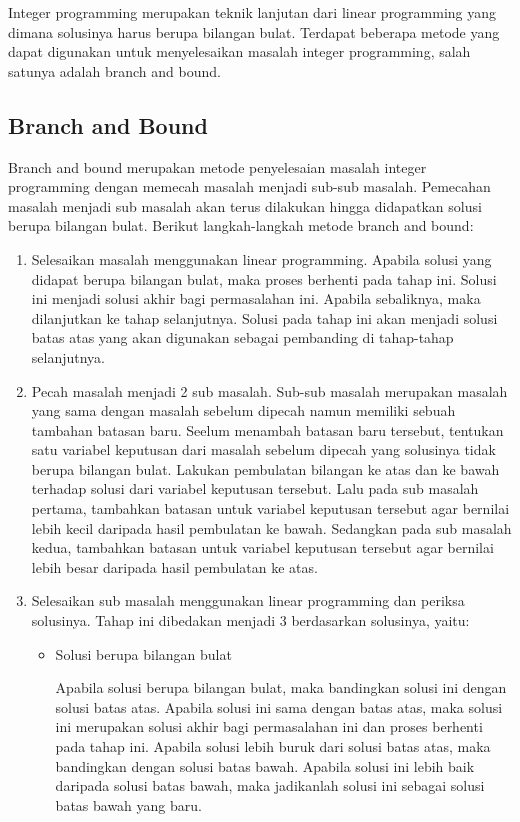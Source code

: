 Integer programming merupakan teknik lanjutan dari linear programming yang dimana solusinya harus berupa bilangan bulat. Terdapat beberapa metode yang dapat digunakan untuk menyelesaikan masalah integer programming, salah satunya adalah branch and bound.

\subsection{Branch and Bound}
\label{branch_and_bound}
Branch and bound merupakan metode penyelesaian masalah integer programming dengan memecah masalah menjadi sub-sub masalah. Pemecahan masalah menjadi sub masalah akan terus dilakukan hingga didapatkan solusi berupa bilangan bulat. Berikut langkah-langkah metode branch and bound:

\begin{enumerate}
	\item Selesaikan masalah menggunakan linear programming. Apabila solusi yang didapat berupa bilangan bulat, maka proses berhenti pada tahap ini. Solusi ini menjadi solusi akhir bagi permasalahan ini. Apabila sebaliknya, maka dilanjutkan ke tahap selanjutnya. Solusi pada tahap ini akan menjadi solusi batas atas yang akan digunakan sebagai pembanding di tahap-tahap selanjutnya.

	\item Pecah masalah menjadi 2 sub masalah. Sub-sub masalah merupakan masalah yang sama dengan masalah sebelum dipecah namun memiliki sebuah tambahan batasan baru. Seelum menambah batasan baru tersebut, tentukan satu variabel keputusan dari masalah sebelum dipecah yang solusinya tidak berupa bilangan bulat. Lakukan pembulatan bilangan ke atas dan ke bawah terhadap solusi dari variabel keputusan tersebut. Lalu pada sub masalah pertama, tambahkan batasan untuk variabel keputusan tersebut agar bernilai lebih kecil daripada hasil pembulatan ke bawah. Sedangkan pada sub masalah kedua, tambahkan batasan untuk variabel keputusan tersebut agar bernilai lebih besar daripada hasil pembulatan ke atas.
	
	\item Selesaikan sub masalah menggunakan linear programming dan periksa solusinya. Tahap ini dibedakan menjadi 3 berdasarkan solusinya, yaitu:
	\begin{itemize}
		\item Solusi berupa bilangan bulat
		
		Apabila solusi berupa bilangan bulat, maka bandingkan solusi ini dengan solusi batas atas. Apabila solusi ini sama dengan batas atas, maka solusi ini merupakan solusi akhir bagi permasalahan ini dan proses berhenti pada tahap ini. Apabila solusi lebih buruk dari solusi batas atas, maka bandingkan dengan solusi batas bawah. Apabila solusi ini lebih baik daripada solusi batas bawah, maka jadikanlah solusi ini sebagai solusi batas bawah yang baru.
		

\end{itemize}
\end{enumerate}
